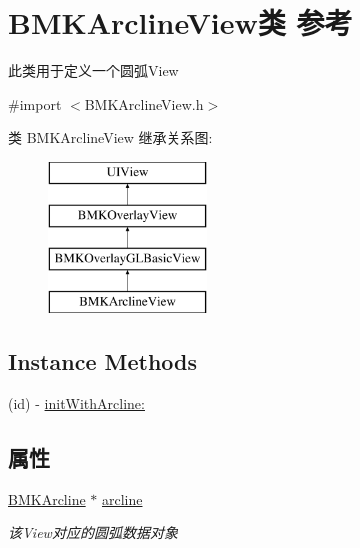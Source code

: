 \hypertarget{interface_b_m_k_arcline_view}{\section{B\+M\+K\+Arcline\+View类 参考}
\label{interface_b_m_k_arcline_view}
}


此类用于定义一个圆弧\+View  




{\ttfamily \#import $<$B\+M\+K\+Arcline\+View.\+h$>$}

类 B\+M\+K\+Arcline\+View 继承关系图\+:\begin{figure}[H]
\begin{center}
\leavevmode
\includegraphics[height=4.000000cm]{interface_b_m_k_arcline_view}
\end{center}
\end{figure}
\subsection*{Instance Methods}
\begin{DoxyCompactItemize}
\item 
(id) -\/ \hyperlink{interface_b_m_k_arcline_view_ab5f05370f8d16895a04be3fb4168210a}{init\+With\+Arcline\+:}
\end{DoxyCompactItemize}
\subsection*{属性}
\begin{DoxyCompactItemize}
\item 
\hypertarget{interface_b_m_k_arcline_view_a824cf05f5bd4ff3790e78095ee72e6c2}{\hyperlink{interface_b_m_k_arcline}{B\+M\+K\+Arcline} $\ast$ \hyperlink{interface_b_m_k_arcline_view_a824cf05f5bd4ff3790e78095ee72e6c2}{arcline}}\label{interface_b_m_k_arcline_view_a824cf05f5bd4ff3790e78095ee72e6c2}

\begin{DoxyCompactList}\small\item\em 该\+View对应的圆弧数据对象 \end{DoxyCompactList}\end{DoxyCompactItemize}
